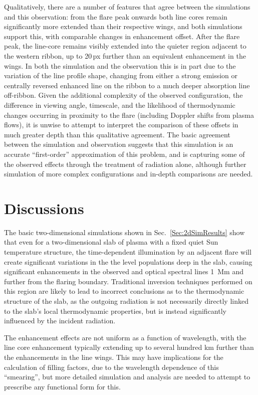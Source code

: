 Qualitatively, there are a number of features that agree between the simulations and this observation: from the flare peak onwards both line cores remain significantly more extended than their respective wings, and both simulations support this, with comparable changes in enhancement offset.
After the flare peak, the line-core remains visibly extended into the quieter region adjacent to the western ribbon, up to 20\,{}px further than an equivalent enhancement in the wings.
In both the simulation and the observation this is in part due to the variation of the line profile shape, changing from either a strong emission or centrally reversed enhanced line on the ribbon to a much deeper absorption line off-ribbon.
Given the additional complexity of the observed configuration, the difference in viewing angle, timescale, and the likelihood of thermodynamic changes occurring in proximity to the flare (including Doppler shifts from plasma flows), it is unwise to attempt to interpret the comparison of these offsets in much greater depth than this qualitative agreement.
The basic agreement between the simulation and observation suggests that this simulation is an accurate ``first-order'' approximation of this problem, and is capturing some of the observed effects through the treatment of radiation alone, although further simulation of more complex configurations and in-depth comparisons are needed.


\section{Discussions}

The basic two-dimensional simulations shown in Sec.~\ref{Sec:2dSimResults} show that even for a two-dimensional slab of plasma with a fixed quiet Sun temperature structure, the time-dependent illumination by an adjacent flare will create significant variations in the the level populations deep in the slab, causing significant enhancements in the observed \Ha{} and \CaLine{} optical spectral lines \SI{1}{\mega\metre} and further from the flaring boundary.
Traditional inversion techniques performed on this region are likely to lead to incorrect conclusions as to the thermodynamic structure of the slab, as the outgoing radiation is not necessarily directly linked to the slab's local thermodynamic properties, but is instead significantly influenced by the incident radiation.

The enhancement effects are not uniform as a function of wavelength, with the line core enhancement typically extending up to several hundred \si{\kilo\metre} further than the enhancements in the line wings.
This may have implications for the calculation of filling factors, due to the wavelength dependence of this ``smearing'', but more detailed simulation and analysis are needed to attempt to prescribe any functional form for this.

